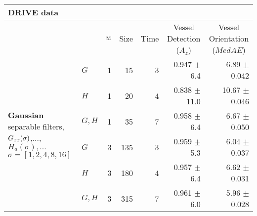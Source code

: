 \begin{tabularx}{\linewidth}{p{3.1cm} p{3cm} r r r r r}
\toprule
\multicolumn{7}{l}{DRIVE data} \\
\midrule
            &
            & $w$
            & Size
            & Time
            & \multicolumn{1}{c}{Vessel Detection \linebreak ($A_z$)}
            & \multicolumn{1}{c}{Vessel Orientation \linebreak ($MedAE$)}  \\

\midrule
\multirow{6}{3.1cm}{\centering
    \textbf{Gaussian}
    \newline separable filters,
    \newline
    \newline $G_{xx}(\sigma)$,..., $H_a(\sigma),...$
    \newline  $\sigma = [1, 2, 4, 8, 16]$ }
        & $G$                       & 1 &  15   &  3    & 0.947 $\pm$ 6.4   & 6.89 $\pm$ 0.042 \\
        & $H$                       & 1 &  20   &  4    & 0.838 $\pm$11.0   &10.67 $\pm$ 0.046 \\
        & $G, H$                    & 1 &  35   &  7    & 0.958 $\pm$ 6.4   & 6.67 $\pm$ 0.050 \\
        & $G$                       & 3 & 135   &  3    & 0.959 $\pm$ 5.3   & 6.04 $\pm$ 0.037 \\
        & $H$                       & 3 & 180   &  4    & 0.957 $\pm$ 6.4   & 6.62 $\pm$ 0.031 \\
        & $G, H$                    & 3 & 315   &  7    & 0.961 $\pm$ 6.0   & 5.96 $\pm$ 0.028 \\


\end{tabularx}

